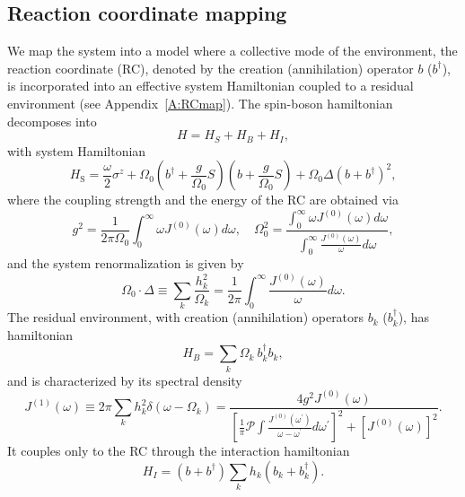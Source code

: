 \documentclass[%
preprint,
onecolumn,
notitlepag,
 amsmath,amssymb,
 aps,
 pra,
]{revtex4-2}
\begin{document}
\subsection{Reaction coordinate mapping}
We map the system  into a model where a collective mode of the environment, the reaction coordinate (RC), denoted by the creation (annihilation) operator $b$ ($b^{\dag}$), is incorporated into an effective system Hamiltonian coupled to a residual environment (see Appendix~\ref{A:RCmap}). The spin-boson hamiltonian decomposes into
\begin{equation}
H = H_{S} + H_{B} + H_{I},
\end{equation}
with system Hamiltonian
\begin{equation}
H_{\text{S}}=\frac{\omega}{2} \sigma^{z}+\Omega_{0}\left(b^{\dagger}+\frac{g}{\Omega_{0}} S\right)\left(b+\frac{g}{\Omega_{0}} S\right)+ \Omega_{0} \Delta (b + b^{\dag})^{2},
\end{equation}
where the coupling strength and the energy of the RC are obtained via
\begin{equation}
g^{2}=\frac{1}{2 \pi \Omega_{0}} \int_{0}^{\infty} \omega J^{(0)}(\omega) d \omega, 
\quad
\Omega_{0}^{2}=\frac{\int_{0}^{\infty} \omega J^{(0)}(\omega) d \omega}{\int_{0}^{\infty} \frac{J^{(0)}(\omega)}{\omega} d \omega},
\end{equation} 
and the system renormalization is given by
\begin{equation}
\Omega_{0} \cdot \Delta \equiv \sum_{k} \frac{h_{k}^{2}}{\Omega_{k}}=\frac{1}{2 \pi} \int_{0}^{\infty} \frac{J^{(0)}(\omega)}{\omega} d \omega.
\end{equation}
The residual environment, with creation (annihilation) operators $b_{k}$ ($b_{k}^{\dag}$),  has hamiltonian
\begin{equation}
H_{B}= \sum_{k} \Omega_{k}\ b_{k}^{\dagger} b_{k}, 
\end{equation}
and is characterized by its spectral density
\begin{equation}
J^{(1)}(\omega) \equiv 2 \pi \sum_{k} h_k^2 \delta(\omega-\Omega_k) = \frac{4 g^{2} J^{(0)}(\omega)}{\left[\frac{1}{\pi} \mathcal{P} \int \frac{J^{(0)}\left(\omega^{\prime}\right)}{\omega-\omega^{\prime}} d \omega^{\prime}\right]^{2}+\left[J^{(0)}(\omega)\right]^{2}}.
\end{equation}
It couples only to the RC through the interaction hamiltonian
\begin{equation}
H_{I} = (b + b^{\dag}) \sum_{k} h_{k} (b_{k} + b_{k}^{\dagger}). 
\end{equation}
\end{document}
